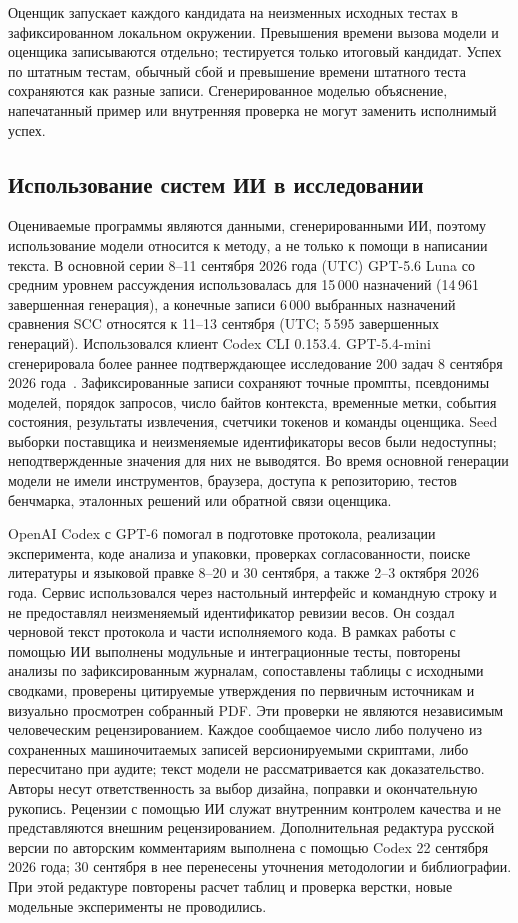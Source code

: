Оценщик запускает каждого кандидата на неизменных исходных тестах в зафиксированном локальном окружении. Превышения времени вызова модели и оценщика записываются отдельно; тестируется только итоговый кандидат. Успех по штатным тестам, обычный сбой и превышение времени штатного теста сохраняются как разные записи. Сгенерированное моделью объяснение, напечатанный пример или внутренняя проверка не могут заменить исполнимый успех.

\subsection{Использование систем ИИ в исследовании}
Оцениваемые программы являются данными, сгенерированными ИИ, поэтому использование модели относится к методу, а не только к помощи в написании текста. В основной серии 8--11 сентября 2026 года (UTC) GPT-5.6 Luna со средним уровнем рассуждения использовалась для 15\,000 назначений (14\,961 завершенная генерация), а конечные записи 6\,000 выбранных назначений сравнения SCC относятся к 11--13 сентября (UTC; 5\,595 завершенных генераций). Использовался клиент Codex CLI 0.153.4. GPT-5.4-mini сгенерировала более раннее подтверждающее исследование 200 задач 8 сентября 2026 года~\cite{openai54mini2026}. Зафиксированные записи сохраняют точные промпты, псевдонимы моделей, порядок запросов, число байтов контекста, временные метки, события состояния, результаты извлечения, счетчики токенов и команды оценщика. Seed выборки поставщика и неизменяемые идентификаторы весов были недоступны; неподтвержденные значения для них не выводятся. Во время основной генерации модели не имели инструментов, браузера, доступа к репозиторию, тестов бенчмарка, эталонных решений или обратной связи оценщика.

OpenAI Codex с GPT-6 помогал в подготовке протокола, реализации эксперимента, коде анализа и упаковки, проверках согласованности, поиске литературы и языковой правке 8--20 и 30 сентября, а также 2--3 октября 2026 года. Сервис использовался через настольный интерфейс и командную строку и не предоставлял неизменяемый идентификатор ревизии весов. Он создал черновой текст протокола и части исполняемого кода. В рамках работы с помощью ИИ выполнены модульные и интеграционные тесты, повторены анализы по зафиксированным журналам, сопоставлены таблицы с исходными сводками, проверены цитируемые утверждения по первичным источникам и визуально просмотрен собранный PDF. Эти проверки не являются независимым человеческим рецензированием. Каждое сообщаемое число либо получено из сохраненных машиночитаемых записей версионируемыми скриптами, либо пересчитано при аудите; текст модели не рассматривается как доказательство. Авторы несут ответственность за выбор дизайна, поправки и окончательную рукопись. Рецензии с помощью ИИ служат внутренним контролем качества и не представляются внешним рецензированием. Дополнительная редактура русской версии по авторским комментариям выполнена с помощью Codex 22 сентября 2026 года; 30 сентября в нее перенесены уточнения методологии и библиографии. При этой редактуре повторены расчет таблиц и проверка верстки, новые модельные эксперименты не проводились.

